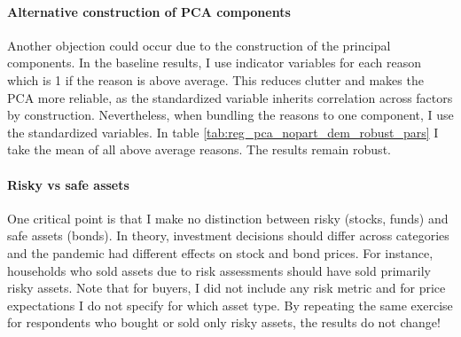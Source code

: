 \documentclass[ProjectABM]{subfiles}
\begin{document}
\paragraph{Alternative construction of PCA components}
Another objection could occur due to the construction of the principal components. In the baseline results, I use indicator variables for each reason which is 1 if the reason is above average. This reduces clutter and makes the PCA more reliable, as the standardized variable inherits correlation across factors by construction. Nevertheless, when bundling the reasons to one component, I use the standardized variables. In table \ref{tab:reg_pca_nopart_dem_robust_pars} I take the mean of all above average reasons. The results remain robust.

\paragraph{Risky vs safe assets}
One critical point is that I make no distinction between risky (stocks, funds) and safe assets (bonds). In theory, investment decisions should differ across categories and the pandemic had different effects on stock and bond prices. For instance, households who sold assets due to risk assessments should have sold primarily risky assets. Note that for buyers, I did not include any risk metric and for price expectations I do not specify for which asset type. %
By repeating the same exercise for respondents who bought or sold only risky assets, the results do not change!

\end{document}

